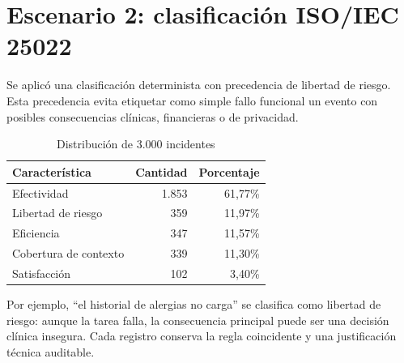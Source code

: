 \chapter{Escenario 2: clasificación ISO/IEC 25022}

Se aplicó una clasificación determinista con precedencia de libertad de riesgo. Esta precedencia evita etiquetar como simple fallo funcional un evento con posibles consecuencias clínicas, financieras o de privacidad.

\begin{table}[H]\centering
\caption{Distribución de 3.000 incidentes}
\begin{tabular}{lrr}\toprule
Característica & Cantidad & Porcentaje\\\midrule
Efectividad & 1.853 & 61,77\%\\
Libertad de riesgo & 359 & 11,97\%\\
Eficiencia & 347 & 11,57\%\\
Cobertura de contexto & 339 & 11,30\%\\
Satisfacción & 102 & 3,40\%\\\bottomrule
\end{tabular}
\end{table}

Por ejemplo, ``el historial de alergias no carga'' se clasifica como libertad de riesgo: aunque la tarea falla, la consecuencia principal puede ser una decisión clínica insegura. Cada registro conserva la regla coincidente y una justificación técnica auditable.

